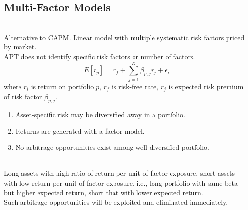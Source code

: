 \subsection{Multi-Factor Models}

\begin{definition} \\
Alternative to CAPM. Linear model with multiple systematic risk factors priced by market.\\
APT does not identify specific risk factors or number of factors.
\begin{equation}
E[r_p] = r_f + \sum\limits_{j=1}^{K} \beta_{p,j} r_{j} + \epsilon_i \nonumber
\end{equation}
where $r_i$ is return on portfolio $p$, $r_f$ is risk-free rate, $r_j$ is expected risk premium of risk factor $\beta_{p,j}$.
\end{definition}

\begin{remark} 
\begin{enumerate}[label=\roman*.]
\setlength{\itemsep}{0pt}
\item Asset-specific risk may be diversified away in a portfolio.
\item Returns are generated with a factor model.
\item No arbitrage opportunities exist among well-diversified portfolio.
\end{enumerate}
\end{remark}

\begin{remark} \\
Long assets with high ratio of return-per-unit-of-factor-exposure, short assets with low return-per-unit-of-factor-exposure. i.e., long portfolio with same beta but higher expected return, short that with lower expected return.\\
Such arbitrage opportunities will be exploited and eliminated immediately.
\end{remark}

